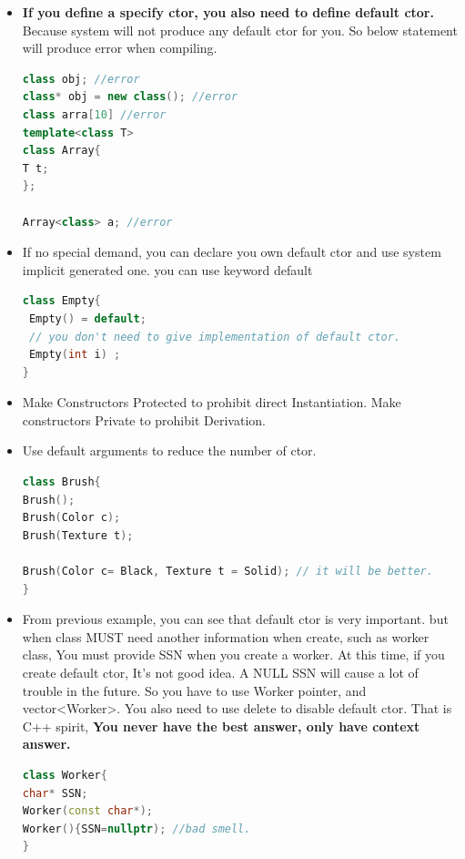 \documentclass[a4paper,12pt,twoside]{book}
\begin{document}
\begin{itemize}
\item \textbf{If you define a specify ctor, you also need to define default ctor.} Because system will not produce any default ctor for you. So below statement will produce error when compiling.
\begin{lstlisting}[frame=single, language=c++]
class obj; //error
class* obj = new class(); //error
class arra[10] //error
template<class T>
class Array{
T t;
};

Array<class> a; //error
\end{lstlisting}

\item If no special demand, you can declare you own default ctor and use system implicit generated one. you can use keyword default
\begin{lstlisting}[frame=single, language=c++]
class Empty{
 Empty() = default;
 // you don't need to give implementation of default ctor.
 Empty(int i) ;
}
\end{lstlisting}


\item Make Constructors Protected to prohibit direct Instantiation. Make constructors Private to prohibit Derivation.

\item Use default arguments to reduce the number of ctor.
\begin{lstlisting}[frame=single, language=c++]
class Brush{
Brush();
Brush(Color c);
Brush(Texture t);

Brush(Color c= Black, Texture t = Solid); // it will be better.
}
\end{lstlisting}


\item From previous example, you can see that default ctor is very important. but when class MUST need another information when create, such as  worker class, You must provide SSN when you create a worker.
At this time, if you create default ctor, It's not good idea. A NULL SSN will cause a lot of trouble in the future.  So you have to use Worker pointer, and vector<Worker>.  You also need to use delete to disable default ctor.
That is C++ spirit, \textbf{You never have the best answer, only have context answer. }
\begin{lstlisting}[frame=single, language=c++]
class Worker{
char* SSN;
Worker(const char*);
Worker(){SSN=nullptr); //bad smell.
}
\end{lstlisting}


\end{itemize}
\end{document}
